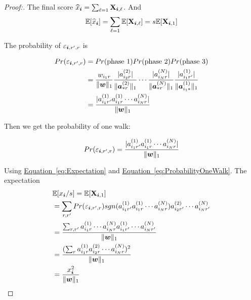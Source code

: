 \documentclass[letterpaper]{article}
\newcommand{\Sca}[3]{{#1}^{(#2)}_{i_#2#3}}%
\newcommand{\V}[1]{{\bm{{\MakeLowercase{#1}}}}}
\newcommand{\VnC}[3]{\V{#1}^{(#2)}_{#3}}
\newcommand{\M}[1]{{\bm{\mathbf{\MakeUppercase{#1}}}}}
\newcommand{\norm}[2]{\|#1\|_{#2}}
\newcommand{\Eqn}[1] {\hyperref[eq:#1]  {Equation~\ref*{eq:#1}}}
\begin{document}
\begin{proof}[Proof:]
The final score $\widehat{x}_{\V{i}} = \sum_{\ell=1}\M{X}_{\V{i},\ell}$. And
\begin{equation}\label{eq:Expectation}
\mathbb{E}[\widehat{x}_{\V{i}}] = \sum_{\ell=1}\mathbb{E}[\M{X}_{\V{i},\ell}]=s\mathbb{E}[\M{X}_{\V{i},1}]
\end{equation}

The probability of $\varepsilon_{\V{i},r',r}$ is

\begin{align*}
Pr(\varepsilon_{\V{i},r',r})
& = Pr({\rm phase\ 1})Pr({\rm phase\ 2})Pr({\rm phase\ 3})\\
&=\frac{w_{i_1r}}{\norm{\V{W}}{1}}
  \frac{|\Sca{a}{2}{r}|}{\norm{{\VnC{a}{2}{*r}}}{1}}\cdots
  \frac{|\Sca{a}{N}{r}|}{\norm{{\VnC{a}{N}{*r}}}{1}}
  \frac{|\Sca{a}{1}{r'}|}{\norm{{\VnC{a}{1}{i_1*}}}{1}}\\
&=\frac{    |\Sca{a}{1}{r'}\Sca{a}{1}{r}\cdots\Sca{a}{N}{r}|    }{\norm{\V{W}}{1}}
\end{align*}

Then we get the probability of one walk:

\begin{equation}\label{eq:ProbabilityOneWalk}
Pr(\varepsilon_{\V{i},r',r})=\frac{|\Sca{a}{1}{r'}\Sca{a}{1}{r}\cdots\Sca{a}{N}{r}|}{\norm{\V{W}}{1}}
\end{equation}

Using \Eqn{Expectation} and \Eqn{ProbabilityOneWalk}. The expectation
\begin{align*}
&\mathbb{E}[x_{\V{i}}/s] = \mathbb{E}[\M{X}_{\V{i},1}]\\
&=\sum_{r,r'} Pr(\varepsilon_{\V{i},r',r}) sgn(\Sca{a}{1}{r'}\Sca{a}{1}{r}\cdots\Sca{a}{N}{r})
\Sca{a}{2}{r'}\cdots\Sca{a}{N}{r'}\\
&=\frac{\sum_{r,r'} \Sca{a}{1}{r}\cdots\Sca{a}{N}{r}\Sca{a}{1}{r'}\cdots\Sca{a}{N}{r'}}{\norm{\V{W}}{1}}\\
&=\frac{(\sum_{r}\Sca{a}{1}{r}\Sca{a}{2}{r}\cdots\Sca{a}{N}{r})^2}{\norm{\V{W}}{1}}\\
&=\frac{x_{\V{i}}^2}{\norm{\V{W}}{1}}
\end{align*}
\end{proof}
\end{document}
